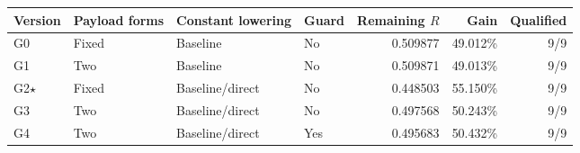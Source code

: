 \begin{tabular}{llllrrr}
\toprule
Version & Payload forms & Constant lowering & Guard & Remaining $R$ & Gain & Qualified \\
\midrule
G0 & Fixed & Baseline & No & 0.509877 & 49.012\% & 9/9 \\
G1 & Two & Baseline & No & 0.509871 & 49.013\% & 9/9 \\
G2$\star$ & Fixed & Baseline/direct & No & 0.448503 & 55.150\% & 9/9 \\
G3 & Two & Baseline/direct & No & 0.497568 & 50.243\% & 9/9 \\
G4 & Two & Baseline/direct & Yes & 0.495683 & 50.432\% & 9/9 \\
\bottomrule
\end{tabular}
